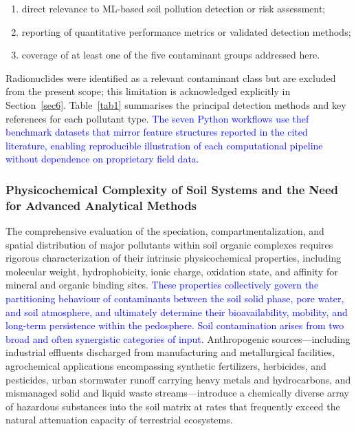 \documentclass[environments,article,submit,pdftex,moreauthors]{Definitions/mdpi}
\begin{document}
\begin{enumerate}[label=(\roman*)]
    \item direct relevance to ML-based soil pollution detection
        or risk assessment;
    \item reporting of quantitative performance metrics or
        validated detection methods;
    \item coverage of at least one of the five contaminant
        groups addressed here.
\end{enumerate}

Radionuclides were identified as a relevant contaminant class but are excluded from the
present scope; this limitation is acknowledged explicitly in
Section~\ref{sec6}. Table~\ref{tab1} summarises the principal
detection methods and key references for each pollutant type. \textcolor{blue}{The
seven Python workflows use theƒ benchmark datasets that mirror
feature structures reported in the cited literature, enabling
reproducible illustration of each computational pipeline without
dependence on proprietary field data.}

\subsubsection{Physicochemical Complexity of Soil Systems and the
    Need for Advanced Analytical Methods}\label{sec2.0.2}

The comprehensive evaluation of the speciation, compartmentalization,
and spatial distribution of major pollutants within soil organic
complexes requires rigorous characterization of their intrinsic
physicochemical properties, including molecular weight, hydrophobicity,
ionic charge, oxidation state, and affinity for mineral and organic
binding sites. \textcolor{blue}{These properties collectively govern
the partitioning behaviour of contaminants between the soil solid
phase, pore water, and soil atmosphere, and ultimately determine their
bioavailability, mobility, and long-term persistence within the
pedosphere. Soil contamination arises from two broad and often
synergistic categories of input.} Anthropogenic sources---including
industrial effluents discharged from manufacturing and metallurgical
facilities, agrochemical applications encompassing synthetic
fertilizers, herbicides, and pesticides, urban stormwater runoff
carrying heavy metals and hydrocarbons, and mismanaged solid and
liquid waste streams---introduce a chemically diverse array of
hazardous substances into the soil matrix at rates that frequently
exceed the natural attenuation capacity of terrestrial ecosystems.
\end{document}
